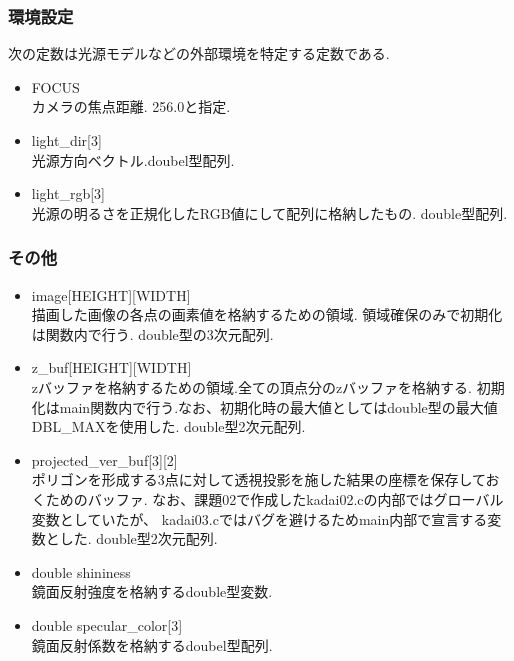 \documentclass[a4j,dvipdfmx]{jsarticle}
\begin{document}
\subsubsection{環境設定}
次の定数は光源モデルなどの外部環境を特定する定数である.
\begin{itemize}
\item FOCUS\\
  カメラの焦点距離. 256.0と指定.
  
\item light\_dir[3]\\
  光源方向ベクトル.doubel型配列.
  
\item light\_rgb[3]\\
  光源の明るさを正規化したRGB値にして配列に格納したもの.
  double型配列.
  
\end{itemize}
\subsubsection{その他}
\begin{itemize}
\item image[HEIGHT][WIDTH]\\
  描画した画像の各点の画素値を格納するための領域.
  領域確保のみで初期化は関数内で行う.
  double型の3次元配列.

\item z\_buf[HEIGHT][WIDTH]\\
  zバッファを格納するための領域.全ての頂点分のzバッファを格納する.
  初期化はmain関数内で行う.なお、初期化時の最大値としてはdouble型の最大値
  DBL\_MAXを使用した.
  double型2次元配列.
  
\item projected\_ver\_buf[3][2]\\
  ポリゴンを形成する3点に対して透視投影を施した結果の座標を保存しておくためのバッファ.
  なお、課題02で作成したkadai02.cの内部ではグローバル変数としていたが、
  kadai03.cではバグを避けるためmain内部で宣言する変数とした.
  double型2次元配列.
\item double shininess\\
  鏡面反射強度を格納するdouble型変数.
  
\item double specular\_color[3]\\
  鏡面反射係数を格納するdoubel型配列.
\end{itemize}
\end{document}

